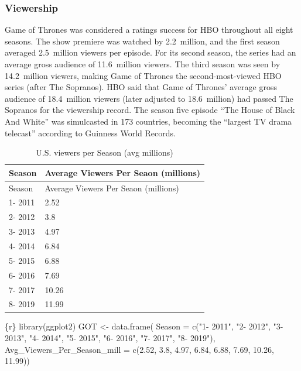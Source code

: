 \documentclass[
  letterpaper,
  DIV=11,
  numbers=noendperiod]{scrartcl}
\newenvironment{Shaded}{\begin{snugshade}}{\end{snugshade}}
\newcommand{\AttributeTok}[1]{\textcolor[rgb]{0.40,0.45,0.13}{#1}}
\newcommand{\FloatTok}[1]{\textcolor[rgb]{0.68,0.00,0.00}{#1}}
\newcommand{\FunctionTok}[1]{\textcolor[rgb]{0.28,0.35,0.67}{#1}}
\newcommand{\InformationTok}[1]{\textcolor[rgb]{0.37,0.37,0.37}{#1}}
\newcommand{\NormalTok}[1]{\textcolor[rgb]{0.00,0.23,0.31}{#1}}
\newcommand{\OtherTok}[1]{\textcolor[rgb]{0.00,0.23,0.31}{#1}}
\newcommand{\StringTok}[1]{\textcolor[rgb]{0.13,0.47,0.30}{#1}}
\begin{document}
\hypertarget{viewership}{%
\subsubsection{\texorpdfstring{\textbf{Viewership}}{Viewership}}\label{viewership}}

Game of Thrones was considered a ratings success for HBO throughout all
eight seasons. The show premiere was watched by 2.2~million, and the
first season averaged 2.5~million viewers per episode. For its second
season, the series had an average gross audience of 11.6~million
viewers. The third season was seen by 14.2~million viewers, making Game
of Thrones the second-most-viewed HBO series (after The Sopranos). HBO
said that Game of Thrones' average gross audience of 18.4~million
viewers (later adjusted to 18.6~million) had passed The Sopranos for the
viewership record. The season five episode ``The House of Black And
White'' was simulcasted in 173 countries, becoming the ``largest TV
drama telecast'' according to Guinness World Records.

\begin{longtable}[]{@{}ll@{}}
\caption{U.S. viewers per Season (avg millions)}\tabularnewline
\toprule()
Season & Average Viewers Per Seaon (millions) \\
\midrule()
\endfirsthead
\toprule()
Season & Average Viewers Per Seaon (millions) \\
\midrule()
\endhead
1- 2011 & 2.52 \\
2- 2012 & 3.8 \\
3- 2013 & 4.97 \\
4- 2014 & 6.84 \\
5- 2015 & 6.88 \\
6- 2016 & 7.69 \\
7- 2017 & 10.26 \\
8- 2019 & 11.99 \\
\bottomrule()
\end{longtable}

\begin{Shaded}
\begin{Highlighting}[]
\InformationTok{\textasciigrave{}\textasciigrave{}\textasciigrave{}\{r\}}
\FunctionTok{library}\NormalTok{(ggplot2)}
\NormalTok{GOT }\OtherTok{\textless{}{-}} \FunctionTok{data.frame}\NormalTok{(}
  \AttributeTok{Season =} \FunctionTok{c}\NormalTok{(}\StringTok{"1{-} 2011"}\NormalTok{, }\StringTok{"2{-} 2012"}\NormalTok{, }\StringTok{"3{-} 2013"}\NormalTok{, }\StringTok{"4{-} 2014"}\NormalTok{, }\StringTok{"5{-} 2015"}\NormalTok{, }\StringTok{"6{-} 2016"}\NormalTok{, }\StringTok{"7{-} 2017"}\NormalTok{, }\StringTok{"8{-} 2019"}\NormalTok{), }\AttributeTok{Avg\_Viewers\_Per\_Season\_mill =} \FunctionTok{c}\NormalTok{(}\FloatTok{2.52}\NormalTok{, }\FloatTok{3.8}\NormalTok{, }\FloatTok{4.97}\NormalTok{, }\FloatTok{6.84}\NormalTok{, }\FloatTok{6.88}\NormalTok{, }\FloatTok{7.69}\NormalTok{, }\FloatTok{10.26}\NormalTok{, }\FloatTok{11.99}\NormalTok{))}
\InformationTok{\textasciigrave{}\textasciigrave{}\textasciigrave{}}
\end{Highlighting}
\end{Shaded}
\end{document}
